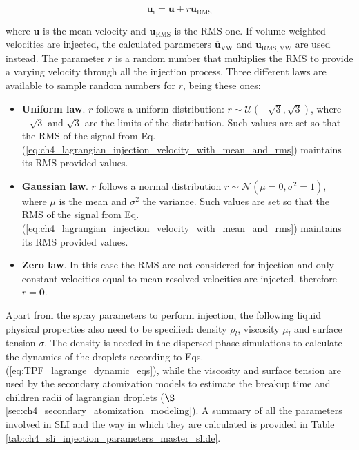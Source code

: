 \begin{itemize}
	
	\begin{equation}	\label{eq:ch4_lagrangian_injection_velocity_with_mean_and_rms}
	\boldsymbol{u}_\mathrm{i} = \overline{\boldsymbol{u}} + r \boldsymbol{u}_\mathrm{RMS}
	\end{equation}
	
	where $\overline{\boldsymbol{u}}$ is the mean velocity and $\boldsymbol{u}_\mathrm{RMS}$ is the RMS one. If volume-weighted velocities are injected, the calculated parameters $\overline{\boldsymbol{u}}_\mathrm{VW}$ and $\boldsymbol{u}_\mathrm{RMS,VW}$ are used instead. The parameter $r$ is a random number that multiplies the RMS to provide a varying velocity through all the injection process. Three different laws are available to sample random numbers for $r$, being these ones:
	
	\begin{itemize}
	
	\item \textbf{Uniform law}. $r$ follows a uniform distribution: $r \sim \mathcal{U} \left(-\sqrt{3},  \sqrt{3} \right)$, where $-\sqrt{3}$ and $\sqrt{3}$ are the limits of the distribution. Such values are set so that the RMS of the signal from Eq. (\ref{eq:ch4_lagrangian_injection_velocity_with_mean_and_rms}) maintains its RMS provided values.
	
	\item \textbf{Gaussian law}. $r$ follows a normal distribution $r \sim \mathcal{N} \left( \mu = 0, \sigma^2 = 1 \right)$, where $\mu$ is the mean and $\sigma^2$ the variance. Such values are set so that the RMS of the signal from Eq. (\ref{eq:ch4_lagrangian_injection_velocity_with_mean_and_rms}) maintains its RMS provided values.
	
	\item \textbf{Zero law}. In this case the RMS are not considered for injection and only constant velocities equal to mean resolved velocities are injected, therefore $r = \textbf{0}$.
	
	\end{itemize}

\end{itemize}

Apart from the spray parameters to perform injection, the following liquid physical properties also need to be specified: density $\rho_l$, viscosity $\mu_l$ and surface tension $\sigma$. The density is needed in the dispersed-phase simulations to calculate the dynamics of the droplets according to Eqs. (\ref{eq:TPF_lagrange_dynamic_eqs}), while the viscosity and surface tension are used by the secondary atomization models to estimate the breakup time and children radii of lagrangian droplets ($\S$\ref{sec:ch4_secondary_atomization_modeling}). A summary of all the parameters involved in SLI and the way in which they are calculated is provided in Table \ref{tab:ch4_sli_injection_parameters_master_slide}.




